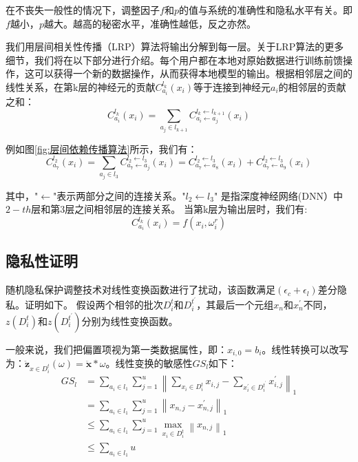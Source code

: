 在不丧失一般性的情况下，调整因子$f$和$p$的值与系统的准确性和隐私水平有关。即$f$越小，$p$越大。越高的秘密水平，准确性越低，反之亦然。

我们用层间相关性传播（LRP）算法将输出分解到每一层。关于LRP算法的更多细节，我们将在以下部分进行介绍。每个用户都在本地对原始数据进行训练前馈操作，这可以获得一个新的数据操作，从而获得本地模型的输出。根据相邻层之间的线性关系，在第k层的神经元的贡献$C_{a_{i}}^{l_{k}}\left(x_{i}\right)$等于连接到神经元$a_{i}$的相邻层的贡献之和：
\begin{equation}\label{eq:神经网络加噪4}
C_{a_{i}}^{l_{k}}\left(x_{i}\right)=\sum_{a_{j} \in l_{k+1}} C_{a_{i} \leftarrow a_{j}}^{l_{k} \leftarrow l_{k+1}}\left(x_{i}\right)
\end{equation}

例如图\ref{fig:层间依赖传播算法}所示，我们有：
\begin{equation}
C_{a_{7}}^{l_{2}}\left(x_{i}\right)=\sum_{a_{j} \in l_{3}} C_{a_{7} \leftarrow a_{j}}^{l_{2} \leftarrow l_{3}}\left(x_{i}\right)=C_{a_{7} \leftarrow a_{8}}^{l_{2} \leftarrow l_{3}}\left(x_{i}\right)+C_{a_{7} \leftarrow a_{9}}^{l_{2} \leftarrow l_{3}}\left(x_{i}\right)
\end{equation}

其中，"$\leftarrow$"表示两部分之间的连接关系。"$l_{2} \leftarrow l_{3}$" 是指深度神经网络(DNN）中$2-t h$层和第3层之间相邻层的连接关系。
当第k层为输出层时，我们有:
\begin{equation}
C_{a_{i}}^{l_{k}}\left(x_{i}\right)=f\left(x_{i}, \omega_{i}^{r}\right)
\end{equation}

\subsection{隐私性证明}
随机隐私保护调整技术对线性变换函数进行了扰动，该函数满足$\left(\epsilon_{c}+\epsilon_{l}\right)$差分隐私。证明如下。
假设两个相邻的批次$D_{i}^{t}$和$D_{i}^{t^{\prime}}$，其最后一个元组$x_{n}$和$x_{n}^{\prime}$不同，$z\left(D_{i}^{t}\right)$和$z\left(D_{i}^{t^{\prime}}\right)$分别为线性变换函数。

一般来说，我们把偏置项视为第一类数据属性，即：$x_{i,0}=b_{i}$。线性转换可以改写为：$\ddot{\mathbf{z}}_{x \in D_{i}^{t}}(\omega)=\ddot{\mathbf{x}} * \omega$。线性变换的敏感性$G S_{l}$如下：
\begin{equation}
\begin{aligned}
G S_{l} &=\sum_{a_{i} \in l_{1}} \sum_{j=1}^{u}\left\|\sum_{x_{i} \in D_{i}^{t}} x_{i, j}-\sum_{x_{i}^{\prime} \in D_{i}^{t^{\prime}}} x_{i, j}^{\prime}\right\|_{1} \\
&=\sum_{a_{i} \in l_{1}} \sum_{j=1}^{u}\left\|x_{n, j}-x_{n, j}^{\prime}\right\|_{1} \\
& \leq \sum_{a_{i} \in l_{1}} \sum_{j=1}^{u} \max _{x_{i} \in D_{i}^{t}}\left\|x_{n, j}\right\|_{1} \\
& \leq \sum_{a_{i} \in l_{1}} u
\end{aligned}
\end{equation}

